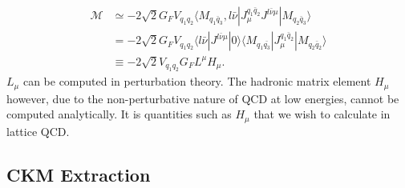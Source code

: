 \begin{align}
  \nonumber
  \mathcal{M} & \simeq -2\sqrt{2} G_F V_{q_1q_2} \langle M_{q_1\bar{q}_3}, l\bar{\nu} | J_{\mu}^{q_1\bar{q}_2} J^{l\bar{\nu} \mu} | M_{q_2\bar{q}_3} \rangle \\
  \nonumber
  & = -2\sqrt{2} G_F V_{q_1q_2} \langle l\bar{\nu} | J^{l\bar{\nu} \mu} | 0 \rangle \langle M_{q_1\bar{q_3}} | J_{\mu}^{q_1\bar{q}_2} | M_{q_2\bar{q}_2} \rangle \\
  & \equiv -2\sqrt{2} V_{q_1q_2} G_F L^{\mu} H_{\mu}.
  \label{eq:LH}
\end{align}
$L_{\mu}$ can be computed in perturbation theory. The hadronic matrix element $H_{\mu}$ however, due to the non-perturbative nature of QCD at low energies,
cannot be computed analytically. It is quantities such as $H_{\mu}$ that we wish to calculate in lattice QCD.

\subsection{CKM Extraction}

